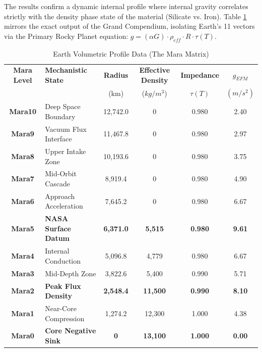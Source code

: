 \documentclass[11pt, a4paper]{article}
\begin{document}
The results confirm a dynamic internal profile where internal gravity correlates strictly with the density phase state of the material (Silicate vs. Iron). Table \ref{tab:earth_micro} mirrors the exact output of the Grand Compendium, isolating Earth's 11 vectors via the Primary Rocky Planet equation: $g = (\alpha G) \cdot \rho_{eff} \cdot R \cdot \tau(T)$.

\begin{footnotesize}
\begin{longtable}{c l c c c c}
\caption{Earth Volumetric Profile Data (The Mara Matrix)} \label{tab:earth_micro} \\
\toprule
\textbf{Mara Level} & \textbf{Mechanistic State} & \textbf{Radius} & \textbf{Effective Density} & \textbf{Impedance} & \textbf{$g_{EFM}$} \\
& & \small{(km)} & \small{($kg/m^3$)} & \small{$\tau(T)$} & \small{$(m/s^2)$} \\
\midrule
\endfirsthead
\midrule
\endhead

\textbf{Mara10} & Deep Space Boundary & 12,742.0 & 0 & 0.980 & 2.40 \\
\textbf{Mara9} & Vacuum Flux Interface & 11,467.8 & 0 & 0.980 & 2.97 \\
\textbf{Mara8} & Upper Intake Zone & 10,193.6 & 0 & 0.980 & 3.75 \\
\textbf{Mara7} & Mid-Orbit Cascade & 8,919.4 & 0 & 0.980 & 4.90 \\
\textbf{Mara6} & Approach Acceleration & 7,645.2 & 0 & 0.980 & 6.67 \\
\midrule
\textbf{Mara5} & \textbf{NASA Surface Datum} & \textbf{6,371.0} & \textbf{5,515} & \textbf{0.980} & \textbf{9.61} \\
\midrule
\textbf{Mara4} & Internal Conduction & 5,096.8 & 4,779 & 0.980 & 6.67 \\
\textbf{Mara3} & Mid-Depth Zone & 3,822.6 & 5,400 & 0.990 & 5.71 \\
\textbf{Mara2} & \textbf{Peak Flux Density} & \textbf{2,548.4} & \textbf{11,500} & \textbf{0.990} & \textbf{8.10} \\
\textbf{Mara1} & Near-Core Compression & 1,274.2 & 12,300 & 1.000 & 4.38 \\
\textbf{Mara0} & \textbf{Core Negative Sink} & \textbf{0} & \textbf{13,100} & \textbf{1.000} & \textbf{0.00} \\
\bottomrule
\end{longtable}
\end{footnotesize}
\end{document}
